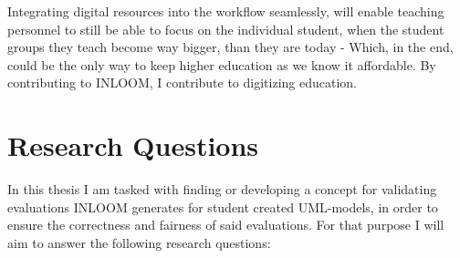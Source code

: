 Integrating digital resources into the workflow seamlessly, will enable teaching 
personnel to still be able to focus on the individual student, when the student
groups they teach become way bigger, than they are today - Which, in the end, could be
the only way to keep higher education as we know it affordable. By contributing to 
INLOOM, I contribute to digitizing education.

\section[Research Questions]{Research Questions}

In this thesis I am tasked with finding or developing a concept for validating
evaluations INLOOM generates for student created UML-models, in order to ensure
the correctness and fairness of said evaluations. For that purpose I will aim to
answer the following research questions:

